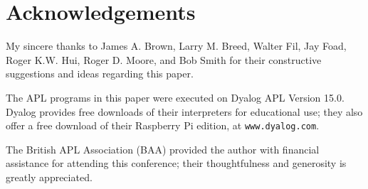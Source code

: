 \section{Acknowledgements}
\label{acknowledgements}

My sincere thanks to James A. Brown, Larry M. Breed, Walter Fil, 
Jay Foad, Roger K.W. Hui, Roger D. Moore, and Bob Smith
for their constructive suggestions and ideas regarding this paper.

The APL programs in this paper were executed on Dyalog APL 
Version 15.0. Dyalog provides free downloads of their interpreters
for educational use; they also offer a free download of their
Raspberry Pi edition, at {\tt www.dyalog.com}.

The British APL Association (BAA) provided the author with
financial assistance for attending this conference;
their thoughtfulness and generosity is greatly appreciated.

